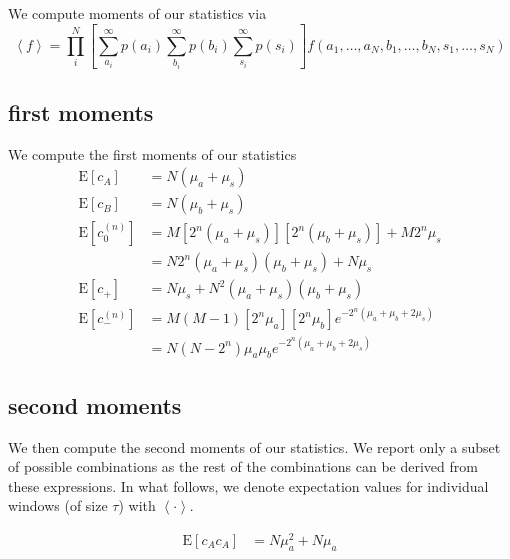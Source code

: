 \documentclass{article}
\begin{document}
We compute moments of our statistics via
\begin{equation}
    \left<f\right> = \prod\limits_i^N\left[ \sum_{a_i}^\infty p(a_i) \sum_{b_i}^\infty p(b_i) \sum_{s_i}^\infty p(s_i) \right] f(a_1, \ldots, a_N, b_1, \ldots, b_N, s_1, \ldots, s_N)
\end{equation}


\subsection*{first moments}
\label{sec:first moments}

We compute the first moments of our statistics
\begin{align}
    \mathrm{E}[c_A]
        &= N(\mu_a + \mu_s) \\
    \mathrm{E}[c_B]
        & = N(\mu_b + \mu_s) \\
    \mathrm{E}[c_0^{(n)}]
        & = M [2^n (\mu_a + \mu_s)] [2^n (\mu_b + \mu_s)] + M 2^n \mu_s \nonumber \\
        & = N 2^n (\mu_a + \mu_s)(\mu_b + \mu_s) + N \mu_s \\
    \mathrm{E}[c_+]
        & = N \mu_s + N^2 (\mu_a + \mu_s) (\mu_b + \mu_s) \\
    \mathrm{E}[c_{-}^{(n)}]
         & = M (M-1) [2^n \mu_a] [2^n \mu_b] e^{-2^n (\mu_a + \mu_b + 2\mu_s)} \nonumber \\
         & = N (N - 2^n) \mu_a \mu_b e^{-2^n (\mu_a + \mu_b + 2\mu_s)}
\end{align}


\subsection*{second moments}
\label{sec:second moments}

We then compute the second moments of our statistics.
We report only a subset of possible combinations as the rest of the combinations can be derived from these expressions.
In what follows, we denote expectation values for individual windows (of size $\tau$) with $\left<\cdot\right>$.


\begin{align}
    \mathrm{E}[c_A c_A]
        & = N \mu_a^2 + N \mu_a
\end{align}

\end{document}
